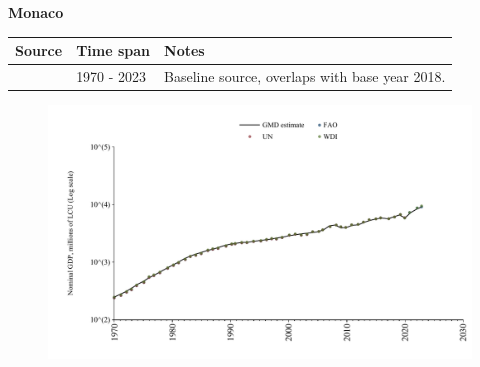 \documentclass[12pt,a4paper,landscape]{article}
\begin{document}
\begin{adjustbox}{max totalsize={\paperwidth}{\paperheight},center}
\begin{minipage}[t][\textheight][t]{\textwidth}
\vspace*{0.5cm}
{}
\begin{center}
{\Large\bfseries Monaco}
\end{center}
\vspace{0.5cm}
\begin{table}[H]
\centering
\small
\begin{tabular}{|l|l|l|}
\hline
\textbf{Source} & \textbf{Time span} & \textbf{Notes} \\
\hline
\rowcolor{white}\cite{WDI}& 1970 - 2023 &Baseline source, overlaps with base year 2018.\\
\hline
\end{tabular}
\end{table}
\begin{figure}[H]
\centering
\includegraphics[width=\textwidth,height=0.6\textheight,keepaspectratio]{graphs/MCO_nGDP.pdf}
\end{figure}
\end{minipage}
\end{adjustbox}
\end{document}
